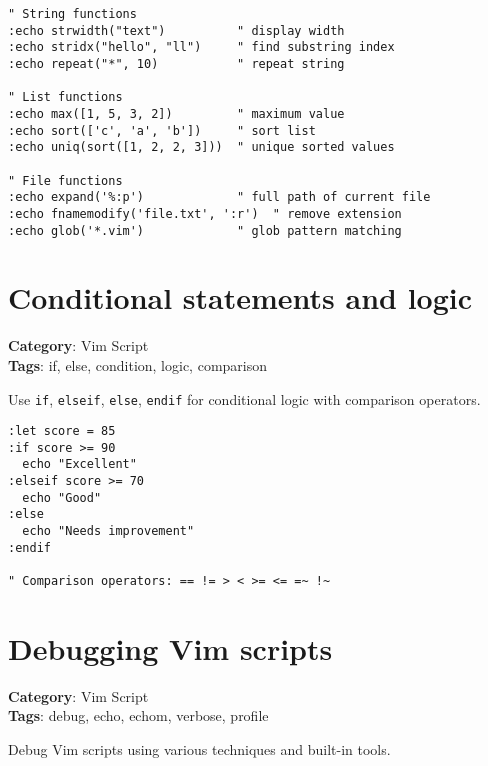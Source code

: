 {{{{{{{{{{{{{{{{{{\begin{Exa*}{}
\begin{Verbatim}[fontsize=\footnotesize, breaklines, breakanywhere]
" String functions
:echo strwidth("text")          " display width
:echo stridx("hello", "ll")     " find substring index
:echo repeat("*", 10)           " repeat string

" List functions
:echo max([1, 5, 3, 2])         " maximum value
:echo sort(['c', 'a', 'b'])     " sort list
:echo uniq(sort([1, 2, 2, 3]))  " unique sorted values

" File functions
:echo expand('%:p')             " full path of current file
:echo fnamemodify('file.txt', ':r')  " remove extension
:echo glob('*.vim')             " glob pattern matching
\end{Verbatim}
\end{Exa*}

\section{Conditional statements and logic}

\textbf{Category}: Vim Script\\ \textbf{Tags}: if, else, condition, logic, comparison
\vspace{0.5cm}

Use {\footnotesize \Verb§if§}, {\footnotesize \Verb§elseif§}, {\footnotesize \Verb§else§}, {\footnotesize \Verb§endif§} for conditional logic with comparison operators.

\begin{Exa*}{}
\begin{Verbatim}[fontsize=\footnotesize, breaklines, breakanywhere]
:let score = 85
:if score >= 90
  echo "Excellent"
:elseif score >= 70
  echo "Good"
:else
  echo "Needs improvement"
:endif

" Comparison operators: == != > < >= <= =~ !~
\end{Verbatim}
\end{Exa*}

\section{Debugging Vim scripts}

\textbf{Category}: Vim Script\\ \textbf{Tags}: debug, echo, echom, verbose, profile
\vspace{0.5cm}

Debug Vim scripts using various techniques and built-in tools.

}}}}}}}}}}}}}}}}}}
